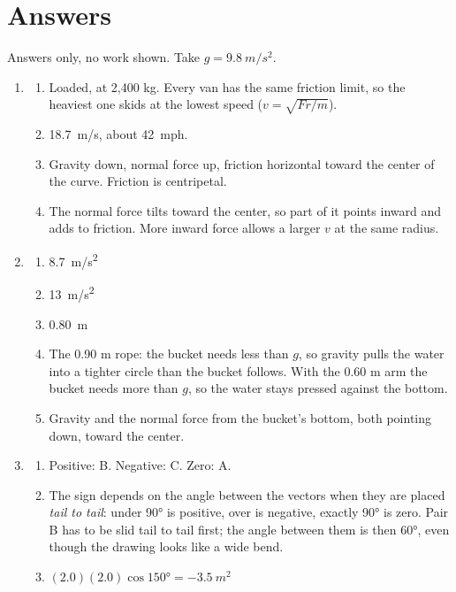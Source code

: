 \documentclass{handout}
\begin{document}
\newpage
\section*{Answers}
{\small{}
Answers only, no work shown. Take $g = \SI{9.8}{m/s^2}$.

\begin{enumerate}
    \item \begin{enumerate}
        \item Loaded, at 2,400 kg. Every van has the same friction limit, so the heaviest one skids at the lowest speed ($v = \sqrt{Fr/m}$).
        \item \SI{18.7}{m/s}, about \SI{42}{mph}.
        \item Gravity down, normal force up, friction horizontal toward the center of the curve. Friction is centripetal.
        \item The normal force tilts toward the center, so part of it points inward and adds to friction. More inward force allows a larger $v$ at the same radius.
    \end{enumerate}
    \item \begin{enumerate}
        \item \SI{8.7}{m/s^2}
        \item \SI{13}{m/s^2}
        \item \SI{0.80}{m}
        \item The 0.90 m rope: the bucket needs less than $g$, so gravity pulls the water into a tighter circle than the bucket follows. With the 0.60 m arm the bucket needs more than $g$, so the water stays pressed against the bottom.
        \item Gravity and the normal force from the bucket's bottom, both pointing down, toward the center.
    \end{enumerate}
    \item \begin{enumerate}
        \item Positive: B. Negative: C. Zero: A.
        \item The sign depends on the angle between the vectors when they are placed \emph{tail to tail}: under \ang{90} is positive, over is negative, exactly \ang{90} is zero. Pair B has to be slid tail to tail first; the angle between them is then \ang{60}, even though the drawing looks like a wide bend.
        \item $(2.0)(2.0)\cos\ang{150} = \SI{-3.5}{m^2}$

\end{enumerate}
\end{enumerate}}
\end{document}
